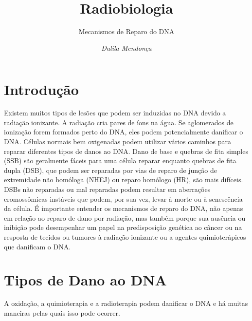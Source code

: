 \documentclass[11pt,a4paper]{article}
\title{\LobsterTwo\Huge{Radiobiologia}}
\author{\LobsterTwo\Large{Mecanismos de Reparo do DNA}\nocite{*}}
\date{\LobsterTwo\textit{Dalila Mendonça}}
\begin{document}
	\maketitle

\section{Introdução}

    Existem muitos tipos de lesões que podem ser induzidas no DNA devido a radiação ionizante. A radiação cria pares de íons na água. Se aglomerados de ionização forem formados perto do DNA, eles podem potencialmente danificar o DNA. Células normais bem oxigenadas podem utilizar vários caminhos para reparar diferentes tipos de danos ao DNA. Dano de base e quebras de fita simples (SSB) são geralmente fáceis para uma célula reparar enquanto quebras de fita dupla (DSB), que podem ser reparadas por vias de reparo de junção de extremidade não homóloga (NHEJ) ou reparo homólogo (HR), são mais difíceis. DSBs não reparadas ou mal reparadas podem resultar em aberrações cromossômicas instáveis que podem, por sua vez, levar à morte ou à senescência da célula. É importante entender os mecanismos de reparo do DNA, não apenas em relação ao reparo de dano por radiação, mas também porque sua ausência ou inibição pode desempenhar um papel na predisposição genética ao câncer ou na resposta de tecidos ou tumores à radiação ionizante ou a agentes quimioterápicos que danificam o DNA.

\section{Tipos de Dano ao DNA}

	A oxidação, a quimioterapia e a radioterapia podem danificar o DNA e há muitas maneiras pelas quais isso pode ocorrer.
\end{document}
